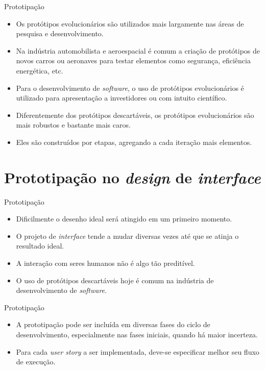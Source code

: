 \documentclass[11pt]{beamer}
\begin{document}
    \begin{frame}{Prototipação}
      \begin{itemize}
        \item Os protótipos evolucionários são utilizados mais largamente nas áreas de pesquisa e desenvolvimento.
        \item Na indústria automobilista e aeroespacial é comum a criação de protótipos de novos carros ou aeronaves para testar elementos como segurança, eficiência energética, etc.
        \item Para o desenvolvimento de \textit{software}, o uso de protótipos evolucionários é utilizado para apresentação a investidores ou com intuito científico.
        \item Diferentemente dos protótipos descartáveis, os protótipos evolucionários são mais robustos e bastante mais caros.
        \item Eles são construídos por etapas, agregando a cada iteração mais elementos.
      \end{itemize}
    \end{frame}

    \section{Prototipação no \textit{design} de \textit{interface}}

    \begin{frame}{Prototipação}
      \begin{itemize}
        \item Dificilmente o desenho ideal será atingido em um primeiro momento.
        \item O projeto de \textit{interface} tende a mudar diversas vezes até que se atinja o resultado ideal.
        \item A interação com seres humanos não é algo tão preditível.
        \item O uso de protótipos descartáveis hoje é comum na indústria de desenvolvimento de \textit{software}.
      \end{itemize}
    \end{frame}

    \begin{frame}{Prototipação}
      \begin{itemize}
          \item A prototipação pode ser incluída em diversas fases do ciclo de desenvolvimento, especialmente nas fases iniciais, quando há maior incerteza.
          \item Para cada \textit{user story} a ser implementada, deve-se especificar melhor seu fluxo de execução.
      \end{itemize}
    \end{frame}
\end{document}
